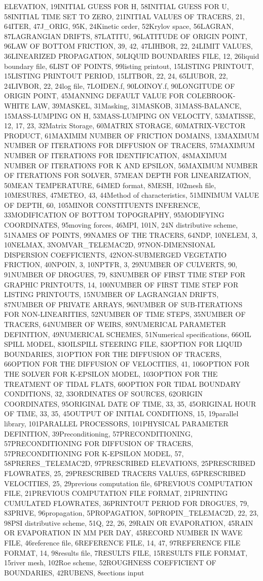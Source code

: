 \documentclass{article} %
\begin{document}
ELEVATION, 19INITIAL GUESS FOR H, 58INITIAL GUESS FOR U, 58INITIAL TIME SET TO ZERO, 21INITIAL VALUES OF TRACERS, 21, 64ITER, 47J\_ORIG, 95K, 24Kinetic order, 52Krylov space, 56LAGRAN, 87LAGRANGIAN DRIFTS, 87LATITU, 96LATITUDE OF ORIGIN POINT, 96LAW OF BOTTOM FRICTION, 39, 42, 47LIHBOR, 22, 24LIMIT VALUES, 36LINEARIZED PROPAGATION, 50LIQUID BOUNDARIES FILE, 12, 26liquid boundary file, 6LIST OF POINTS, 99listing printout, 15LISTING PRINTOUT, 15LISTING PRINTOUT PERIOD, 15LITBOR, 22, 24, 65LIUBOR, 22, 24LIVBOR, 22, 24log file, 7LOIDEN.f, 90LOINOY.f, 90LONGITUDE OF ORIGIN POINT, 45MANNING DEFAULT VALUE FOR COLEBROOK-WHITE LAW, 39MASKEL, 31Masking, 31MASKOB, 31MASS-BALANCE, 15MASS-LUMPING ON H, 53MASS-LUMPING ON VELOCITY, 53MATISSE, 12, 17, 23, 32Matrix Storage, 60MATRIX STORAGE, 60MATRIX-VECTOR PRODUCT, 61MAXIMIM NUMBER OF FRICTION DOMAINS, 13MAXIMUM NUMBER OF ITERATIONS FOR DIFFUSION OF TRACERS, 57MAXIMUM NUMBER OF ITERATIONS FOR IDENTIFICATION, 48MAXIMUM NUMBER OF ITERATIONS FOR K AND EPSILON, 56MAXIMUM NUMBER OF ITERATIONS FOR SOLVER, 57MEAN DEPTH FOR LINEARIZATION, 50MEAN TEMPERATURE, 64MED format, 8MESH, 102mesh file, 10MESURES, 47METEO, 43, 44Method of characteristics, 51MINIMUM VALUE OF DEPTH, 60, 105MINOR CONSTITUENTS INFERENCE, 33MODIFICATION OF BOTTOM TOPOGRAPHY, 95MODIFYING COORDINATES, 95moving forces, 46MPI, 101N, 24N distributive scheme, 51NAMES OF POINTS, 99NAMES OF THE TRACERS, 64NDP, 10NELEM, 3, 10NELMAX, 3NOMVAR\_TELEMAC2D, 97NON-DIMENSIONAL DISPERSION COEFFICIENTS, 42NON-SUBMERGED VEGETATIO FRICTION, 40NPOIN, 3, 10NPTFR, 3, 29NUMBER OF CULVERTS, 90, 91NUMBER OF DROGUES, 79, 83NUMBER OF FIRST TIME STEP FOR GRAPHIC PRINTOUTS, 14, 100NUMBER OF FIRST TIME STEP FOR LISTING PRINTOUTS, 15NUMBER OF LAGRANGIAN DRIFTS, 87NUMBER OF PRIVATE ARRAYS, 96NUMBER OF SUB-ITERATIONS FOR NON-LINEARITIES, 52NUMBER OF TIME STEPS, 35NUMBER OF TRACERS, 64NUMBER OF WEIRS, 89NUMERICAL PARAMETER DEFINITION, 49NUMERICAL SCHEMES, 51Numerical specifications, 66OIL SPILL MODEL, 83OILSPILL STEERING FILE, 83OPTION FOR LIQUID BOUNDARIES, 31OPTION FOR THE DIFFUSION OF TRACERS, 66OPTION FOR THE DIFFUSION OF VELOCITIES, 41, 106OPTION FOR THE SOLVER FOR K-EPSILON MODEL, 103OPTION FOR THE TREATMENT OF TIDAL FLATS, 60OPTION FOR TIDAL BOUNDARY CONDITIONS, 32, 33ORDINATES OF SOURCES, 62ORIGIN COORDINATES, 95ORIGINAL DATE OF TIME, 33, 35, 45ORIGINAL HOUR OF TIME, 33, 35, 45OUTPUT OF INITIAL CONDITIONS, 15, 19parallel library, 101PARALLEL PROCESSORS, 101PHYSICAL PARAMETER DEFINITION, 39Preconditioning, 57PRECONDITIONING, 57PRECONDITIONING FOR DIFFUSION OF TRACERS, 57PRECONDITIONING FOR K-EPSILON MODEL, 57, 58PRERES\_TELEMAC2D, 97PRESCRIBED ELEVATIONS, 25PRESCRIBED FLOWRATES, 25, 29PRESCRIBED TRACERS VALUES, 65PRESCRIBED VELOCITIES, 25, 29previous computation file, 6PREVIOUS COMPUTATION FILE, 21PREVIOUS COMPUTATION FILE FORMAT, 21PRINTING CUMULATED FLOWRATES, 36PRINTOUT PERIOD FOR DROGUES, 79, 83PRIVE, 96propagation, 5PROPAGATION, 50PROPIN\_TELEMAC2D, 22, 23, 98PSI distributive scheme, 51Q, 22, 26, 29RAIN OR EVAPORATION, 45RAIN OR EVAPORATION IN MM PER DAY, 45RECORD NUMBER IN WAVE FILE, 46reference file, 6REFERENCE FILE, 14, 47, 97REFERENCE FILE FORMAT, 14, 98results file, 7RESULTS FILE, 15RESULTS FILE FORMAT, 15river mesh, 102Roe scheme, 52ROUGHNESS COEFFICIENT OF BOUNDARIES, 42RUBENS, 8sections input 
\end{document}
